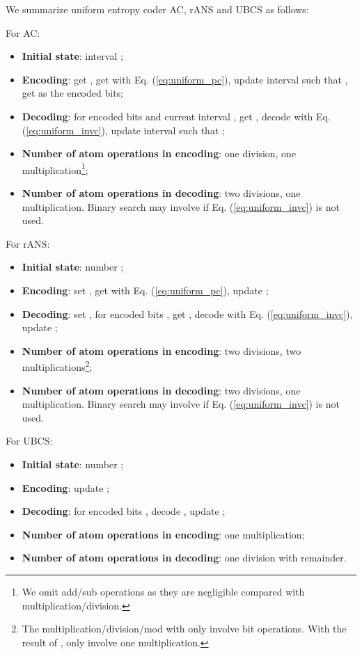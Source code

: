 \documentclass{article}
\begin{document}
We summarize uniform entropy coder AC, rANS and UBCS as follows:

For AC:
\begin{itemize}
    \item {\bf Initial state}: interval ;
    \item {\bf Encoding}: get , get  with Eq. (\ref{eq:uniform_pc}), update interval  such that , get  as the encoded bits; 
    \item {\bf Decoding}: for encoded bits  and current interval , get , decode  with Eq. (\ref{eq:uniform_invc}), update interval  such that ;
    \item {\bf Number of atom operations in encoding}: one division, one multiplication\footnote{We omit add/sub operations as they are negligible compared with multiplication/division.};
    \item {\bf Number of atom operations in decoding}: two divisions, one multiplication. Binary search may involve if Eq. (\ref{eq:uniform_invc}) is not used. 
\end{itemize}

For rANS:
\begin{itemize}
    \item {\bf Initial state}: number ;
    \item {\bf Encoding}: set , get  with Eq. (\ref{eq:uniform_pc}), update ; 
    \item {\bf Decoding}: set , for encoded bits , get , decode  with Eq. (\ref{eq:uniform_invc}), update ;
    \item {\bf Number of atom operations in encoding}: two divisions, two multiplications\footnote{The multiplication/division/mod with  only involve bit operations. With the result of ,  only involve one multiplication.};
    \item {\bf Number of atom operations in decoding}: two divisions, one multiplication. Binary search may involve if Eq. (\ref{eq:uniform_invc}) is not used. 
\end{itemize}

For UBCS:
\begin{itemize}
    \item {\bf Initial state}: number ;
    \item {\bf Encoding}: update ; 
    \item {\bf Decoding}: for encoded bits , decode , update ;
    \item {\bf Number of atom operations in encoding}: one multiplication;
    \item {\bf Number of atom operations in decoding}: one division with remainder. 
\end{itemize}
\end{document}
